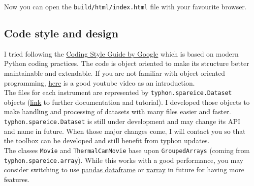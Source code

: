 \documentclass[11pt,a4paper]{article}
\begin{document}
Now you can open the \texttt{build/html/index.html} file with your favourite browser.

\subsection{Code style and design}
I tried following the \href{https://google.github.io/styleguide/pyguide.html}{Coding Style Guide by Google}  which is based on modern Python coding practices. The code is object oriented to make its structure better maintainable and extendable. If you are not familiar with object oriented programming, \href{https://www.youtube.com/watch?v=ZDa-Z5JzLYM}{here} is a good youtube video as an introduction.\\

The files for each instrument are represented by \texttt{typhon.spareice.Dataset} objects (\href{http://radiativetransfer.org/misc/typhon/doc-trunk/tutorials/dataset.html}{link} to further documentation and tutorial). I developed those objects to make handling and processing of datasets with many files easier and faster. \texttt{typhon.spareice.Dataset} is still under development and may change its API and name in future. When those major changes come, I will contact you so that the \cloud toolbox can be developed and still benefit from typhon updates.\\

The classes \texttt{Movie} and \texttt{ThermalCamMovie} base upon \texttt{GroupedArrays} (coming from \texttt{typhon.spareice.array}). While this works with a good performance, you may consider switching to use \href{https://pandas.pydata.org/pandas-docs/stable/generated/pandas.DataFrame.html#pandas-dataframe}{pandas dataframe} or \href{http://xarray.pydata.org/en/stable/}{xarray} in future for having more features.
\end{document}
